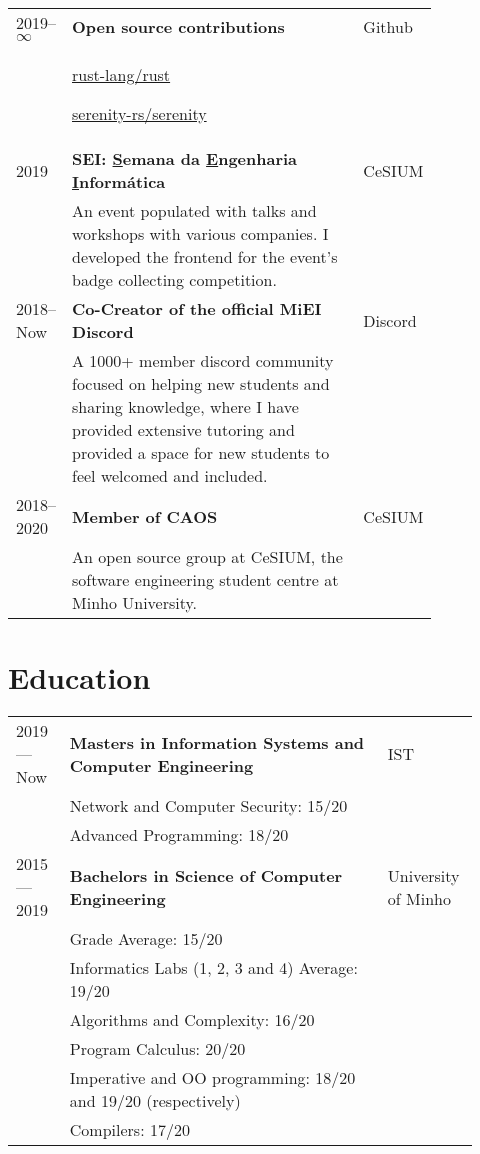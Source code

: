 \documentclass{article}
\begin{document}
\begin{tabular}{p{0.11\linewidth}p{0.73\linewidth}l}
    2019--$\infty$ & \textbf{Open source contributions} & Github\\ &
    \href{https://github.com/rust-lang/rust/pulls?q=author\%3Amendess+}
    {rust-lang/rust}

    \href{https://github.com/serenity-rs/serenity/pulls?q=author\%3Amendess+}
    {serenity-rs/serenity} &\\

    2019 & \textbf{SEI\@: \underline{S}emana da \underline{E}ngenharia
    \underline{I}nformática} & CeSIUM \\
    & An event populated with talks and workshops with various companies. I
    developed the frontend for the event's badge collecting competition. &\\

    2018--Now & \textbf{Co-Creator of the official MiEI
    Discord} & Discord\\
    & A 1000+ member discord community focused on helping new students and
    sharing knowledge, where I have provided extensive tutoring and provided a
    space for new students to feel welcomed and included. &\\

    2018--2020 & \textbf{Member of CAOS} & CeSIUM\\
    & An open source group at CeSIUM, the software engineering student centre at
    Minho University. &\\

\end{tabular}

\section{Education}

\begin{tabular}{p{0.11\linewidth}p{0.65\linewidth}p{0.16\linewidth}}

    2019 --- Now & \textbf{Masters in Information Systems and Computer
    Engineering} & IST\\
    & Network and Computer Security: 15/20 &\\
    & Advanced Programming: 18/20 &\\

    2015 --- 2019 & \textbf{Bachelors in Science of Computer Engineering} &
    University of Minho\\
    & Grade Average: 15/20 &\\
    & Informatics Labs (1, 2, 3 and 4) Average: 19/20 & \\
    & Algorithms and Complexity: 16/20 & \\
    & Program Calculus: 20/20 & \\
    & Imperative and OO programming: 18/20 and 19/20 (respectively) &\\
    & Compilers: 17/20 &\\

\end{tabular}


\end{document}
